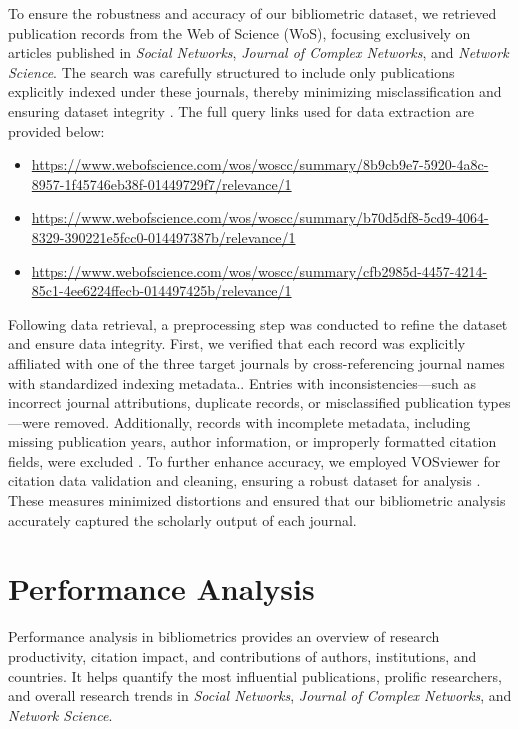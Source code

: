 \documentclass[twocolumn]{article}
\begin{document}
	To ensure the robustness and accuracy of our bibliometric dataset, we retrieved publication records from the Web of Science (WoS), focusing exclusively on articles published in \textit{Social Networks}, \textit{Journal of Complex Networks}, and \textit{Network Science}. The search was carefully structured to include only publications explicitly indexed under these journals, thereby minimizing misclassification and ensuring dataset integrity \cite{Moed2005}. The full query links used for data extraction are provided below:
	\begin{itemize}
		\item \url{https://www.webofscience.com/wos/woscc/summary/8b9cb9e7-5920-4a8c-8957-1f45746eb38f-01449729f7/relevance/1}
		\item 	\url{https://www.webofscience.com/wos/woscc/summary/b70d5df8-5cd9-4064-8329-390221e5fcc0-014497387b/relevance/1}
		\item 	\url{https://www.webofscience.com/wos/woscc/summary/cfb2985d-4457-4214-85c1-4ee6224ffecb-014497425b/relevance/1}
	\end{itemize}
	
	Following data retrieval, a preprocessing step was conducted to refine the dataset and ensure data integrity. First, we verified that each record was explicitly affiliated with one of the three target journals by cross-referencing journal names with standardized indexing metadata.\cite{donthu2021bibliometric}. Entries with inconsistencies—such as incorrect journal attributions, duplicate records, or misclassified publication types—were removed. Additionally, records with incomplete metadata, including missing publication years, author information, or improperly formatted citation fields, were excluded \cite{Aria2017}. To further enhance accuracy, we employed VOSviewer for citation data validation and cleaning, ensuring a robust dataset for analysis \cite{vanEck2010}. These measures minimized distortions and ensured that our bibliometric analysis accurately captured the scholarly output of each journal.
	
	
	\section{Performance Analysis}\label{Performance Analysis}
	
	Performance analysis in bibliometrics provides an overview of research productivity, citation impact, and contributions of authors, institutions, and countries. It helps quantify the most influential publications, prolific researchers, and overall research trends in \textit{Social Networks}, \textit{Journal of Complex Networks}, and \textit{Network Science}.
	
\end{document}
